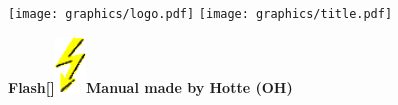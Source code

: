 \documentclass[german,a4paper,twoside]{scrreprt}
\def\bbblitz{\includegraphics[height=4.0em]{Bilder/blitz1.png}}
\begin{document}
\vspace*{2cm}

\begin{center}
  \texttt{[image: graphics/logo.pdf]}
  \vskip 0.5cm
  \texttt{[image: graphics/title.pdf]}
\end{center}

\vspace*{2cm}

\begin{center}
{\Large\textbf{\textsf{Flash\raisebox{-\baselineskip}[\ht\strutbox]{\bbblitz}Manual made by Hotte (OH)}}}\\
\end{center}

\tableofcontents
\printindex
\end{document}
